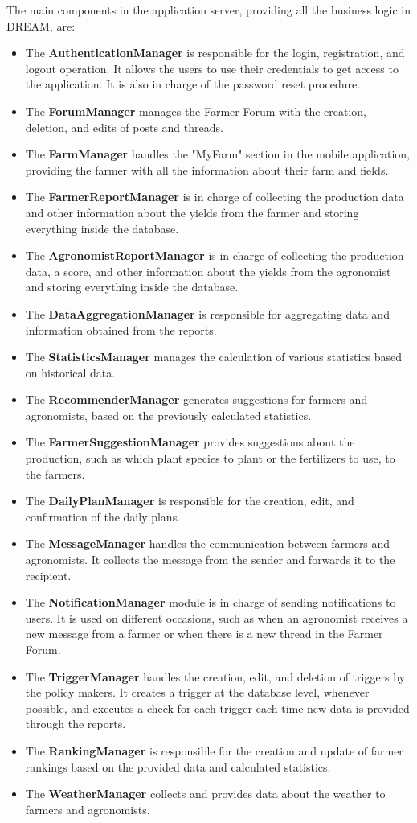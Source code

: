 \noindent
The main components in the application server, providing all the business logic in DREAM, are:

\begin{itemize}
	\item The \textbf{AuthenticationManager} is responsible for the login, registration, and logout operation. It allows the users to use their credentials to get access to the application. It is also in charge of the password reset procedure.
	\item The \textbf{ForumManager} manages the Farmer Forum with the creation, deletion, and edits of posts and threads. 
	\item The \textbf{FarmManager} handles the "MyFarm" section in the mobile application, providing the farmer with all the information about their farm and fields.
	\item The \textbf{FarmerReportManager} is in charge of collecting the production data and other information about the yields from the farmer and storing everything inside the database.
	\item The \textbf{AgronomistReportManager} is in charge of collecting the production data, a score, and other information about the yields from the agronomist and storing everything inside the database.
	\item The \textbf{DataAggregationManager} is responsible for aggregating data and information obtained from the reports.
	\item The \textbf{StatisticsManager} manages the calculation of various statistics based on historical data.
	\item The \textbf{RecommenderManager} generates suggestions for farmers and agronomists, based on the previously calculated statistics.
	\item The \textbf{FarmerSuggestionManager} provides suggestions about the production, such as which plant species to plant or the fertilizers to use, to the farmers.
	\item The \textbf{DailyPlanManager} is responsible for the creation, edit, and confirmation of the daily plans.
	\item The \textbf{MessageManager} handles the communication between farmers and agronomists. It collects the message from the sender and forwards it to the recipient.
	\item The \textbf{NotificationManager} module is in charge of sending notifications to users. It is used on different occasions, such as when an agronomist receives a new message from a farmer or when there is a new thread in the Farmer Forum.
	\item The \textbf{TriggerManager} handles the creation, edit, and deletion of triggers by the policy makers. It creates a trigger at the database level, whenever possible, and executes a check for each trigger each time new data is provided through the reports.
	\item The \textbf{RankingManager} is responsible for the creation and update of farmer rankings based on the provided data and calculated statistics.
	\item The \textbf{WeatherManager} collects and provides data about the weather to farmers and agronomists.
\end{itemize}

